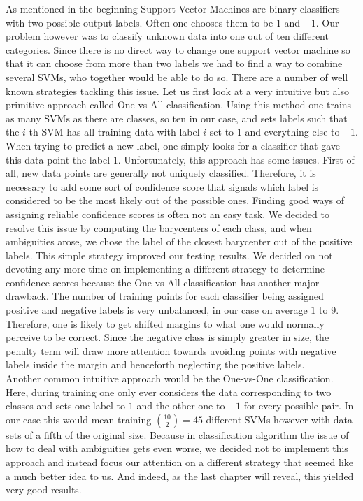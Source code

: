 As mentioned in the beginning Support Vector Machines are binary classifiers with two possible output labels. Often one chooses them to be $1$ and $-1$. Our problem however was to classify unknown data into one out of ten different categories. Since there is no direct way to change one support vector machine so that it can choose from more than two labels we had to find a way to combine several SVMs, who together would be able to do so. There are a number of well known strategies tackling this issue. Let us first look at a very intuitive but also primitive approach called One-vs-All classification. Using this method one trains as many SVMs as there are classes, so ten in our case, and sets labels such that the $i$-th SVM has all training data with label $i$ set to 1 and everything else to $-1$. When trying to predict a new label, one simply looks for a classifier that gave this data point the label 1. Unfortunately, this approach has some issues. First of all, new data points are generally not uniquely classified. Therefore, it is necessary to add some sort of confidence score that signals which label is considered to be the most likely out of the possible ones. Finding good ways of assigning reliable confidence scores is often not an easy task. We decided to resolve this issue by computing the barycenters of each class, and when ambiguities arose, we chose the label of the closest barycenter out of the positive labels. This simple strategy improved our testing results. We decided on not devoting any more time on implementing a different strategy to determine confidence scores because the One-vs-All classification has another major drawback. The number of training points for each classifier being assigned positive and negative labels is very unbalanced, in our case on average $1$ to $9$. Therefore, one is likely to get shifted margins to what one would normally perceive to be correct. Since the negative class is simply greater in size, the penalty term will draw more attention towards avoiding points with negative labels inside the margin and henceforth neglecting the positive labels.\\ 

Another common intuitive approach would be the One-vs-One classification. Here, during training one only ever considers the data corresponding to two classes and sets one label to $1$ and the other one to $-1$ for every possible pair. 
In our case this would mean training $\binom{10}{2} =45$ different SVMs however with data sets of a fifth of the original size. Because in classification algorithm the issue of how to deal with ambiguities gets even worse, we decided not to implement this approach and instead focus our attention on a different strategy that seemed like a much better idea to us. And indeed, as the last chapter will reveal, this yielded very good results.

